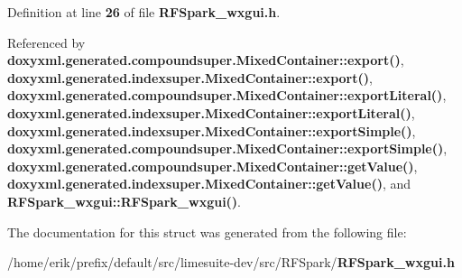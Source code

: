 Definition at line {\bf 26} of file {\bf R\+F\+Spark\+\_\+wxgui.\+h}.



Referenced by {\bf doxyxml.\+generated.\+compoundsuper.\+Mixed\+Container\+::export()}, {\bf doxyxml.\+generated.\+indexsuper.\+Mixed\+Container\+::export()}, {\bf doxyxml.\+generated.\+compoundsuper.\+Mixed\+Container\+::export\+Literal()}, {\bf doxyxml.\+generated.\+indexsuper.\+Mixed\+Container\+::export\+Literal()}, {\bf doxyxml.\+generated.\+indexsuper.\+Mixed\+Container\+::export\+Simple()}, {\bf doxyxml.\+generated.\+compoundsuper.\+Mixed\+Container\+::export\+Simple()}, {\bf doxyxml.\+generated.\+compoundsuper.\+Mixed\+Container\+::get\+Value()}, {\bf doxyxml.\+generated.\+indexsuper.\+Mixed\+Container\+::get\+Value()}, and {\bf R\+F\+Spark\+\_\+wxgui\+::\+R\+F\+Spark\+\_\+wxgui()}.



The documentation for this struct was generated from the following file\+:\begin{DoxyCompactItemize}
\item 
/home/erik/prefix/default/src/limesuite-\/dev/src/\+R\+F\+Spark/{\bf R\+F\+Spark\+\_\+wxgui.\+h}\end{DoxyCompactItemize}
